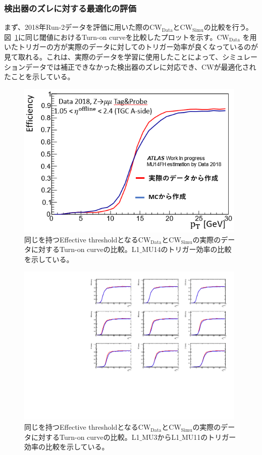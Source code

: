 \subsubsection{検出器のズレに対する最適化の評価}
まず、2018年Run-2データを評価に用いた際の$\mathrm{CW_{Data}}$と$\mathrm{CW_{Simu}}$の比較を行う。図~\ref{fig:v06v07}に同じ閾値におけるTurn-on curveを比較したプロットを示す。$\mathrm{CW_{Data}}$ を用いたトリガーの方が実際のデータに対してのトリガー効率が良くなっているのが見て取れる。これは、実際のデータを学習に使用したことによって、シミュレーションデータでは補正できなかった検出器のズレに対応でき、CWが最適化されたことを示している。
\begin{figure}[tb]
  \centering
  \includegraphics[clip, width=11cm]{fig/4/hikaku_v06_v07.png}
  \caption{同じを持つEffective thresholdとなる$\mathrm{CW_{Data}}$と$\mathrm{CW_{Simu}}$の実際のデータに対するTurn-on curveの比較。L1$\_$MU14のトリガー効率の比較を示している。}
  \label{fig:v06v07}
\end{figure}

\begin{figure}[h]
  \centering
  \includegraphics[clip, width=11cm]{fig/5/v06v07_1_15.pdf}
  \caption{同じを持つEffective thresholdとなる$\mathrm{CW_{Data}}$と$\mathrm{CW_{Simu}}$の実際のデータに対するTurn-on curveの比較。L1$\_$MU3からL1$\_$MU11のトリガー効率の比較を示している。}
  \label{fig:v06v07_1_9}
\end{figure}

